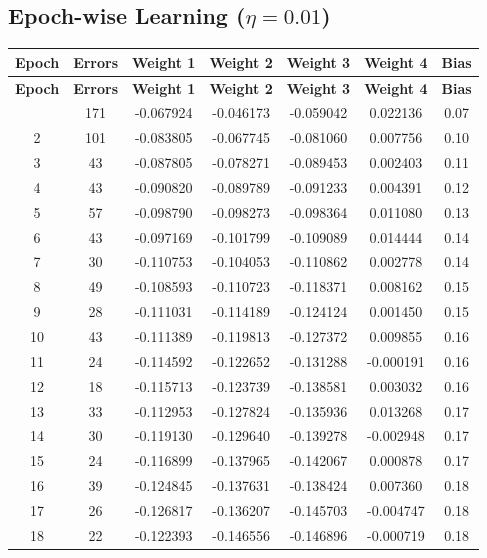 \documentclass[11pt]{article}
\begin{document}
\subsection*{Epoch-wise Learning ($\eta = 0.01$)}

\begin{longtable}{|c|c|c|c|c|c|c|}
\hline
\textbf{Epoch} & \textbf{Errors} & \textbf{Weight 1} & \textbf{Weight 2} & \textbf{Weight 3} & \textbf{Weight 4} & \textbf{Bias}\\
\hline
\endfirsthead
\hline
\textbf{Epoch} & \textbf{Errors} & \textbf{Weight 1} & \textbf{Weight 2} & \textbf{Weight 3} & \textbf{Weight 4} & \textbf{Bias}\\
\hline
\endhead
\hline
\endfoot
\hline
\endlastfoot
1 & 171 & -0.067924 & -0.046173 & -0.059042 & 0.022136 & 0.07 \\
2 & 101 & -0.083805 & -0.067745 & -0.081060 & 0.007756 & 0.10 \\
3 & 43 & -0.087805 & -0.078271 & -0.089453 & 0.002403 & 0.11 \\
4 & 43 & -0.090820 & -0.089789 & -0.091233 & 0.004391 & 0.12 \\
5 & 57 & -0.098790 & -0.098273 & -0.098364 & 0.011080 & 0.13 \\
6 & 43 & -0.097169 & -0.101799 & -0.109089 & 0.014444 & 0.14 \\
7 & 30 & -0.110753 & -0.104053 & -0.110862 & 0.002778 & 0.14 \\
8 & 49 & -0.108593 & -0.110723 & -0.118371 & 0.008162 & 0.15 \\
9 & 28 & -0.111031 & -0.114189 & -0.124124 & 0.001450 & 0.15 \\
10 & 43 & -0.111389 & -0.119813 & -0.127372 & 0.009855 & 0.16 \\
11 & 24 & -0.114592 & -0.122652 & -0.131288 & -0.000191 & 0.16 \\
12 & 18 & -0.115713 & -0.123739 & -0.138581 & 0.003032 & 0.16 \\
13 & 33 & -0.112953 & -0.127824 & -0.135936 & 0.013268 & 0.17 \\
14 & 30 & -0.119130 & -0.129640 & -0.139278 & -0.002948 & 0.17 \\
15 & 24 & -0.116899 & -0.137965 & -0.142067 & 0.000878 & 0.17 \\
16 & 39 & -0.124845 & -0.137631 & -0.138424 & 0.007360 & 0.18 \\
17 & 26 & -0.126817 & -0.136207 & -0.145703 & -0.004747 & 0.18 \\
18 & 22 & -0.122393 & -0.146556 & -0.146896 & -0.000719 & 0.18 \\

\end{longtable}
\end{document}
